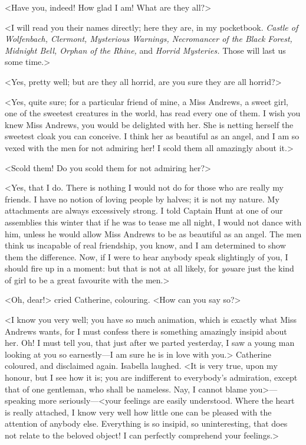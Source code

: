  <Have you, indeed! How glad I am! What are they all?> 

 <I will read you their names directly; here they are, in my pocketbook. \textit{Castle of Wolfenbach, Clermont, Mysterious Warnings, Necromancer of the Black Forest, Midnight Bell, Orphan of the Rhine,} and \textit{Horrid Mysteries.} Those will last us some time.> 

 <Yes, pretty well; but are they all horrid, are you sure they are all horrid?> 

 <Yes, quite sure; for a particular friend of mine, a Miss Andrews, a sweet girl, one of the sweetest creatures in the world, has read every one of them. I wish you knew Miss Andrews, you would be delighted with her. She is netting herself the sweetest cloak you can conceive. I think her as beautiful as an angel, and I am so vexed with the men for not admiring her! I scold them all amazingly about it.> 

 <Scold them! Do you scold them for not admiring her?> 

 <Yes, that I do. There is nothing I would not do for those who are really my friends. I have no notion of loving people by halves; it is not my nature. My attachments are always excessively strong. I told Captain Hunt at one of our assemblies this winter that if he was to tease me all night, I would not dance with him, unless he would allow Miss Andrews to be as beautiful as an angel. The men think us incapable of real friendship, you know, and I am determined to show them the difference. Now, if I were to hear anybody speak slightingly of you, I should fire up in a moment: but that is not at all likely, for \textit{you}are just the kind of girl to be a great favourite with the men.> 

 <Oh, dear!> cried Catherine, colouring. <How can you say so?> 

 <I know you very well; you have so much animation, which is exactly what Miss Andrews wants, for I must confess there is something amazingly insipid about her. Oh! I must tell you, that just after we parted yesterday, I saw a young man looking at you so earnestly—I am sure he is in love with you.> Catherine coloured, and disclaimed again. Isabella laughed. <It is very true, upon my honour, but I see how it is; you are indifferent to everybody's admiration, except that of one gentleman, who shall be nameless. Nay, I cannot blame you>—speaking more seriously—<your feelings are easily understood. Where the heart is really attached, I know very well how little one can be pleased with the attention of anybody else. Everything is so insipid, so uninteresting, that does not relate to the beloved object! I can perfectly comprehend your feelings.> 

